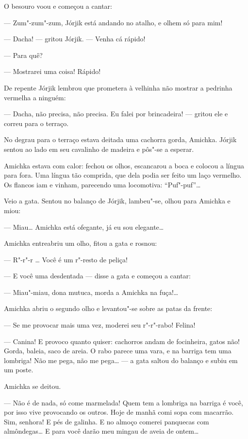 O besouro voou e começou a cantar:

--- Zum"-zum"-zum, Jórjik está andando no atalho, e olhem só para mim!

--- Dacha! --- gritou Jórjik. --- Venha cá rápido!

--- Para quê?

--- Mostrarei uma coisa! Rápido!

De repente Jórjik lembrou que prometera à velhinha não mostrar a
pedrinha vermelha a ninguém:

--- Dacha, não precisa, não precisa. Eu falei por brincadeira! ---
gritou ele e correu para o terraço.

No degrau para o terraço estava deitada uma cachorra gorda, Amichka.
Jórjik sentou ao lado em seu cavalinho de madeira e pôs"-se a esperar.

Amichka estava com calor: fechou os olhos, escancarou a boca e colocou a
língua para fora. Uma língua tão comprida, que dela podia ser feito um
laço vermelho. Os flancos iam e vinham, parecendo uma locomotiva:
``Puf"-puf''\ldots{}

Veio a gata. Sentou no balanço de Jórjik, lambeu"-se, olhou para Amichka
e miou:

--- Miau\ldots{} Amichka está ofegante, já eu sou elegante\ldots{}

Amichka entreabriu um olho, fitou a gata e rosnou:

--- R"-r"-r \ldots{} Você é um r"-resto de peliça!

--- E você uma desdentada --- disse a gata e começou a cantar:

--- Miau"-miau, dona mutuca, morda a Amichka na fuça!\ldots{}

Amichka abriu o segundo olho e levantou"-se sobre as patas da frente:

--- Se me provocar mais uma vez, moderei seu r"-r"-rabo! Felina!

--- Canina! E provoco quanto quiser: cachorros andam de focinheira,
gatos não! Gorda, baleia, saco de areia. O rabo parece uma vara, e na
barriga tem uma lombriga! Não me pega, não me pega\ldots{} --- a gata saltou
do balanço e subiu em um poste.

Amichka se deitou.

--- Não é de nada, só come marmelada! Quem tem a lombriga na barriga é
você, por isso vive provocando os outros. Hoje de manhã comi sopa com
macarrão. Sim, senhora! E pés de galinha. E no almoço comerei panquecas
com almôndegas\ldots{} E para você darão meu mingau de aveia de ontem\ldots{}

